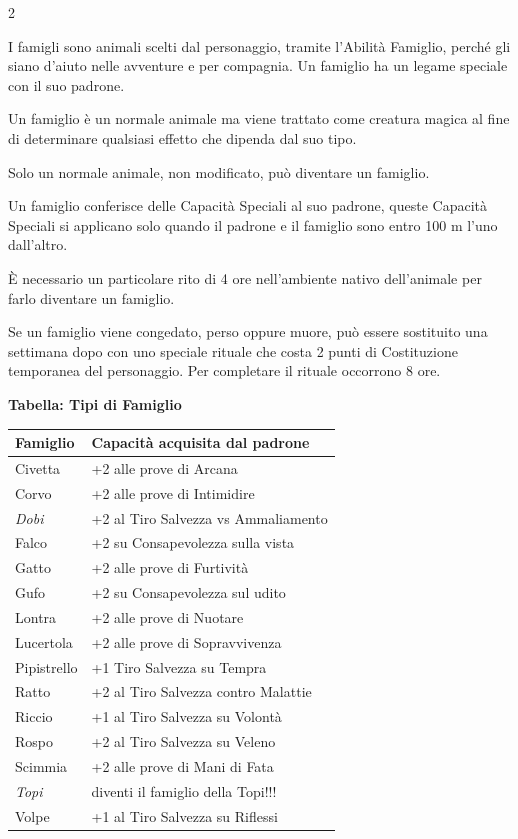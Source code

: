 \begin{multicols}{2}

I famigli sono animali scelti dal personaggio, tramite l'Abilità Famiglio, perché gli siano d'aiuto nelle avventure e per compagnia. Un famiglio ha un legame speciale con il suo padrone.

Un famiglio è un normale animale ma viene trattato come creatura magica al fine di determinare qualsiasi effetto che dipenda dal suo tipo.

Solo un normale animale, non modificato, può diventare un famiglio.

Un famiglio conferisce delle Capacità Speciali al suo padrone, queste Capacità Speciali si applicano solo quando il padrone e il famiglio sono entro 100 m l'uno dall'altro.

È necessario un particolare rito di 4 ore nell'ambiente nativo dell'animale per farlo diventare un famiglio.

Se un famiglio viene congedato, perso oppure muore, può essere sostituito una settimana dopo con uno speciale rituale che costa 2 punti di Costituzione temporanea del personaggio. Per completare il rituale occorrono 8 ore.

\medskip

\textbf{Tabella: Tipi di Famiglio}

\medskip

\noindent\begin{tabularx}{\linewidth}{lX}
	\toprule
\rowcolor{gray!20}\textbf{Famiglio} & \textbf{Capacità acquisita dal padrone}\\
\toprule
Civetta & +2 alle prove di Arcana\\
\rowcolor{gray!20}Corvo & +2 alle prove di Intimidire\\
\emph{Dobi}& +2 al Tiro Salvezza vs Ammaliamento\\
\rowcolor{gray!20}Falco & +2 su Consapevolezza sulla vista\\
Gatto & +2 alle prove di Furtività\\
\rowcolor{gray!20}Gufo & +2 su Consapevolezza sul udito\\
Lontra & +2 alle prove di Nuotare\\
\rowcolor{gray!20}Lucertola & +2 alle prove di Sopravvivenza\\
Pipistrello & +1 Tiro Salvezza su Tempra\\
\rowcolor{gray!20}Ratto & +2 al Tiro Salvezza contro Malattie\\
Riccio & +1 al Tiro Salvezza su Volontà\\
\rowcolor{gray!20}Rospo & +2 al Tiro Salvezza su Veleno\\
Scimmia & +2 alle prove di Mani di Fata\\
\rowcolor{gray!20}\emph{Topi} & diventi il famiglio della Topi!!!\\
Volpe & +1 al Tiro Salvezza su Riflessi
\end{tabularx}


\end{multicols}
